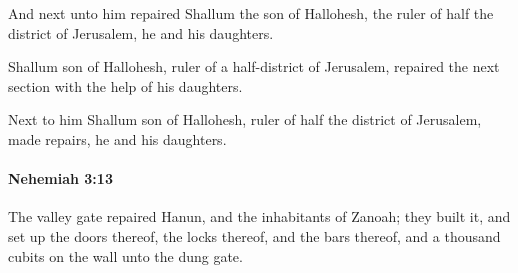 			\begin{versebox}
					\item[BHS] 
					\item[LXX] 
					\item[ASV] And next unto him repaired Shallum the son of Hallohesh, the ruler of half the district of Jerusalem, he and his daughters.
					\item[NIV] Shallum son of Hallohesh, ruler of a half-district of Jerusalem, repaired the next section with the help of his daughters.
					\item[NRSV] Next to him Shallum son of Hallohesh, ruler of half the district of Jerusalem, made repairs, he and his daughters.
			\end{versebox}

		\paragraph{Nehemiah 3:13} %
			\label{NEHEMIAH-3-13}

			The valley gate repaired Hanun, and the inhabitants of Zanoah; they built it, and set up the doors thereof, the locks thereof, and the bars thereof, and a thousand cubits on the wall unto the dung gate.

